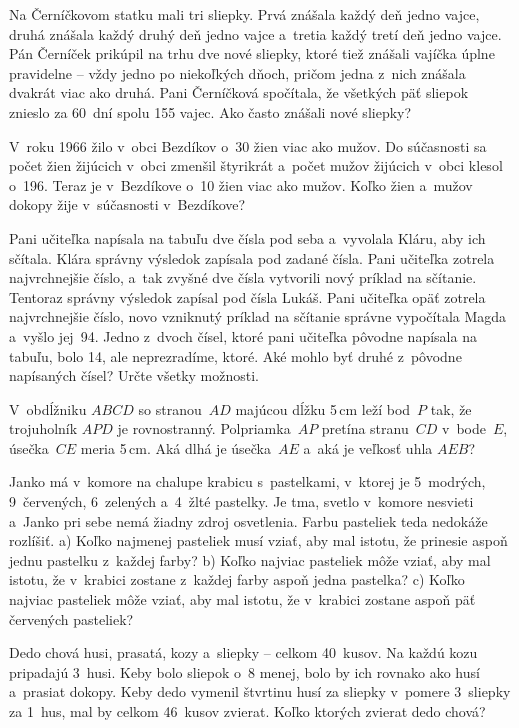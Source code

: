 {%
Na Černíčkovom statku mali tri sliepky.
Prvá znášala každý deň jedno vajce, druhá znášala každý druhý deň jedno vajce a~tretia každý tretí deň jedno vajce.
Pán Černíček prikúpil na trhu dve nové sliepky, ktoré tiež znášali vajíčka úplne pravidelne
-- vždy jedno po niekoľkých dňoch, pričom jedna z~nich znášala dvakrát viac ako druhá.
Pani Černíčková spočítala, že všetkých päť sliepok znieslo za 60~dní spolu 155 vajec.
Ako často znášali nové sliepky?
}

{%
V~roku 1966 žilo v~obci Bezdíkov o~30 žien viac ako mužov.
Do súčasnosti sa počet žien žijúcich v~obci zmenšil štyrikrát a~počet mužov žijúcich v~obci klesol o~196.
Teraz je v~Bezdíkove o~10 žien viac ako mužov. Koľko žien a~mužov dokopy žije v~súčasnosti v~Bezdíkove?
}

{%
Pani učiteľka napísala na tabuľu dve čísla pod seba a~vyvolala Kláru, aby ich sčítala.
Klára správny výsledok zapísala pod zadané čísla.
Pani učiteľka zotrela najvrchnejšie číslo, a~tak zvyšné dve čísla vytvorili nový príklad na sčítanie.
Tentoraz správny výsledok zapísal pod čísla Lukáš.
Pani učiteľka opäť zotrela najvrchnejšie číslo, novo vzniknutý príklad na sčítanie správne vypočítala Magda a~vyšlo jej~94.
Jedno z~dvoch čísel, ktoré pani učiteľka pôvodne napísala na tabuľu, bolo 14, ale neprezradíme, ktoré.
Aké mohlo byť druhé z~pôvodne napísaných čísel?
Určte všetky možnosti.}

{%
V~obdĺžniku $ABCD$ so stranou~$AD$ majúcou dĺžku 5\,cm leží bod~$P$ tak, že trojuholník $APD$ je
rovnostranný.
Polpriamka~$AP$ pretína stranu~$CD$ v~bode~$E$, úsečka~$CE$ meria 5\,cm.
Aká dlhá je úsečka~$AE$ a~aká je veľkosť uhla $AEB$?
}

{%
Janko má v~komore na chalupe krabicu s~pastelkami, v~ktorej je 5~modrých, 9~červených, 6~zelených a~4~žlté pastelky.
Je tma, svetlo v~komore nesvieti a~Janko pri sebe nemá žiadny zdroj osvetlenia.
Farbu pasteliek teda nedokáže rozlíšiť.
\ite a) Koľko najmenej pasteliek musí vziať, aby mal istotu, že prinesie aspoň jednu pastelku z~každej farby?
\ite b) Koľko najviac pasteliek môže vziať, aby mal istotu, že v~krabici zostane z~každej farby aspoň jedna pastelka?
\ite c) Koľko najviac pasteliek môže vziať, aby mal istotu, že v~krabici zostane aspoň päť červených pasteliek?\endgraf
}

{%
Dedo chová husi, prasatá, kozy a~sliepky -- celkom 40~kusov.
Na každú kozu pripadajú 3~husi.
Keby bolo sliepok o~8 menej, bolo by ich rovnako ako husí a~prasiat dokopy.
Keby dedo vymenil štvrtinu husí za sliepky v~pomere 3~sliepky za
1~hus, mal by celkom 46~kusov zvierat.
Koľko ktorých zvierat dedo chová?
}


